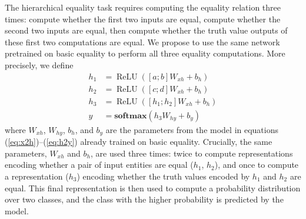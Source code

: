 \documentclass[9pt,twocolumn,twoside,lineno]{pnas-new}
\newcommand{\eg}[1]{(\ref{#1})}
\newcommand{\dasheg}[2]{\eg{#1}--\eg{#2}}
\newcommand{\softmax}{\mathbf{softmax}}
\DeclareMathOperator{\ReLU}{ReLU}
\begin{document}
The hierarchical equality task requires computing the equality relation three times: compute whether the first two inputs are equal, compute whether the second two inputs are equal, then compute whether the truth value outputs of these first two computations are equal. We propose to use the same network pretrained on basic equality to perform all three equality computations.  More precisely, we define
%
\begin{align}
h_1 &= \ReLU([a;b]W_{xh} + b_{h})\\
h_2 &= \ReLU([c;d]W_{xh} + b_{h})\\
h_3 &= \ReLU([h_1;h_2]W_{xh} + b_{h}) \\
y &= \softmax(h_3W_{hy} + b_{y})
\end{align}
%
where $W_{xh}$, $W_{hy}$, $b_h$, and $b_y$ are the parameters from the model in equations \dasheg{eq:x2h}{eq:h2y} already trained on basic equality.  Crucially, the same parameters, $W_{xh}$ and $b_h$, are used three times: twice to compute representations encoding whether a pair of input entities are equal ($h_1$, $h_2$), and once to compute a representation ($h_{3}$) encoding whether the truth values encoded by $h_1$ and $h_2$ are equal. This final representation is then used to compute a probability distribution over two classes, and the class with the higher probability is predicted by the model.
\end{document}
